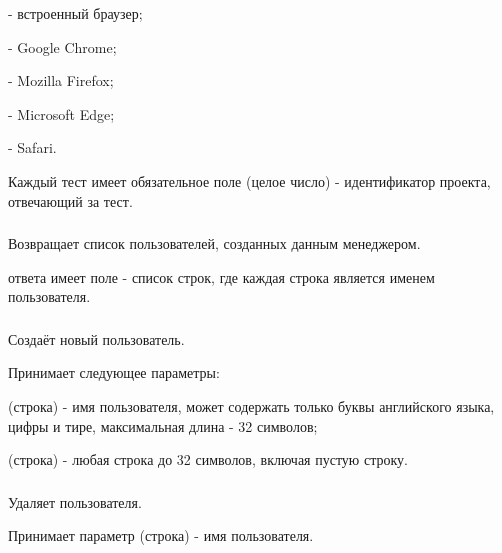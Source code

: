 \begin{icItems}
	\item {} - встроенный браузер;
	\item {} - Google Chrome;
	\item {} - Mozilla Firefox;
	\item {} - Microsoft Edge;
	\item {} - Safari.
\end{icItems}

Каждый тест имеет обязательное поле  (целое число) - идентификатор проекта, отвечающий за тест.

\subsubsection{}

Возвращает список пользователей, созданных данным менеджером.

 ответа имеет поле  - список строк, где каждая строка является именем пользователя.

\subsubsection{}

Создаёт новый пользователь.

Принимает следующее параметры:

\begin{icItems}
	\item {} (строка) - имя пользователя, может содержать только буквы английского языка, цифры и тире, максимальная длина - 32 символов;
	\item {} (строка) - любая строка до 32 символов, включая пустую строку.
\end{icItems}

\subsubsection{}

Удаляет пользователя.

Принимает параметр  (строка) - имя пользователя.

\subsubsection{}

